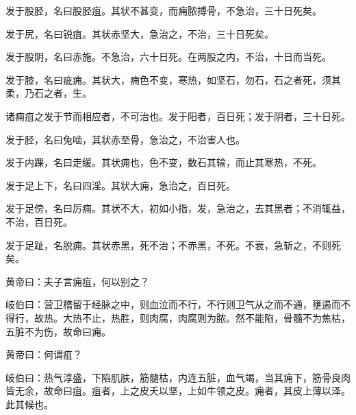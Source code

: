 \documentclass[a4paper,12pt,UTF8,twoside]{ctexbook}
\begin{document}
	发于股胫，名曰股胫疽。其状不甚变，而痈脓搏骨，不急治，三十日死矣。
	
	发于尻，名曰锐疽。其状赤坚大，急治之，不治，三十日死矣。
	
	发于股阴，名曰赤施。不急治，六十日死。在两股之内，不治，十日而当死。
	
	发于膝，名曰疵痈。其状大，痈色不变，寒热，如坚石，勿石，石之者死，须其柔，乃石之者，生。
	
	诸痈疽之发于节而相应者，不可治也。发于阳者，百日死；发于阴者，三十日死。
	
	发于胫，名曰兔啮，其状赤至骨，急治之，不治害人也。
	
	发于内踝，名曰走缓。其状痈也，色不变，数石其输，而止其寒热，不死。
	
	发于足上下，名曰四淫。其状大痈，急治之，百日死。
	
	发于足傍，名曰厉痈。其状不大，初如小指，发，急治之，去其黑者；不消辄益，不治，百日死。
	
	发于足趾，名脱痈。其状赤黑，死不治；不赤黑，不死。不衰，急斩之，不则死矣。
	
	黄帝曰：夫子言痈疽，何以别之？
	
	岐伯曰：营卫稽留于经脉之中，则血泣而不行，不行则卫气从之而不通，壅遏而不得行，故热。大热不止，热胜，则肉腐，肉腐则为脓。然不能陷，骨髓不为焦枯，五脏不为伤，故命曰痈。
	
	黄帝曰：何谓疽？
	
	岐伯曰：热气淳盛，下陷肌肤，筋髓枯，内连五脏，血气竭，当其痈下，筋骨良肉皆无余，故命曰疽。疽者，上之皮夭以坚，上如牛领之皮。痈者，其皮上薄以泽。此其候也。
	
\end{document}
